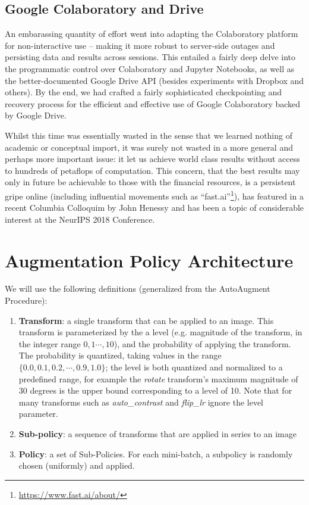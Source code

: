 \documentclass[10pt,twocolumn,letterpaper]{article}
\begin{document}
  \subsection{Google Colaboratory and Drive}
    An embarassing quantity of effort went into adapting the Colaboratory platform for non-interactive use -- making it more robust to server-side outages and persisting data and results across sessions. This entailed a fairly deep delve into the programmatic control over Colaboratory and Jupyter Notebooks, as well as the better-documented Google Drive API (besides experiments with Dropbox and others). By the end, we had crafted a fairly sophisticated checkpointing and recovery process for the efficient and effective use of Google Colaboratory backed by Google Drive.

    Whilst this time was essentially wasted in the sense that we learned nothing of academic or conceptual import, it was surely not wasted in a more general and perhaps more important issue: it let us achieve world class results without access to hundreds of petaflops of computation. This concern, that the best results may only in future be achievable to those with the financial resources, is a persistent gripe online (including influential movements such as ``fast.ai''\footnote{\url{https://www.fast.ai/about/}}), has featured in a recent Columbia Colloquim by John Henessy and has been a topic of considerable interest at the NeurIPS 2018 Conference. %

\section{Augmentation Policy Architecture}
  We will use the following definitions (generalized from the AutoAugment Procedure):

  \begin{enumerate}

    \item[] 
      \textbf{Transform}: a single transform that can be applied to an image. This transform is parameterized by the a level (e.g. magnitude of the transform, in the integer range $0,1 \cdots, 10$), and the probability of applying the transform. The probability is quantized, taking values in the range $\{0.0, 0.1, 0.2, \cdots, 0.9, 1.0\}$; the level is both quantized and normalized to a predefined range, for example the \textit{rotate} transform's maximum magnitude of $30$ degrees is the upper bound corresponding to a level of 10. Note that for many transforms such as \textit{auto\_contrast} and \textit{flip\_lr} ignore the level parameter.
    \item[] 
      \textbf{Sub-policy}: a sequence of transforms that are applied in series to an image
    \item[] 
      \textbf{Policy}: a set of Sub-Policies. For each mini-batch, a subpolicy is randomly chosen (uniformly) and applied.
  \end{enumerate}
\end{document}
